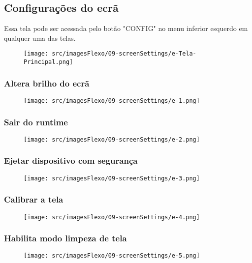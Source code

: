 \thispagestyle{fancy}
\vspace*{\fill}
\subsection{Configurações do ecrã}
 Essa tela pode ser acessada pelo botão "CONFIG" no menu inferior esquerdo em qualquer uma das telas.
\begin{figure}[h]
  \centering
  \texttt{[image: src/imagesFlexo/09-screenSettings/e-Tela-Principal.png]}
\end{figure}

\newpage
\thispagestyle{fancy}
\vspace*{\fill}
\subsubsection{\small{Altera brilho do ecrã}}
\begin{figure}[h]
  \centering
  \texttt{[image: src/imagesFlexo/09-screenSettings/e-1.png]}
\end{figure}
\vspace*{\fill}

\newpage
\thispagestyle{fancy}
\vspace*{\fill}
\subsubsection{\small{Sair do runtime}}
\begin{figure}[h]
  \centering
  \texttt{[image: src/imagesFlexo/09-screenSettings/e-2.png]}
\end{figure}
\vspace*{\fill}

\newpage
\thispagestyle{fancy}
\vspace*{\fill}
\subsubsection{\small{Ejetar dispositivo com segurança}}
\begin{figure}[h]
  \centering
  \texttt{[image: src/imagesFlexo/09-screenSettings/e-3.png]}
\end{figure}
\vspace*{\fill}

\newpage
\thispagestyle{fancy}
\vspace*{\fill}
\subsubsection{\small{Calibrar a tela}}
\begin{figure}[h]
  \centering
  \texttt{[image: src/imagesFlexo/09-screenSettings/e-4.png]}
\end{figure}
\vspace*{\fill}

\newpage
\thispagestyle{fancy}
\vspace*{\fill}
\subsubsection{\small{Habilita modo limpeza de tela}}
\begin{figure}[h]
  \centering
  \texttt{[image: src/imagesFlexo/09-screenSettings/e-5.png]}
\end{figure}
\vspace*{\fill}
